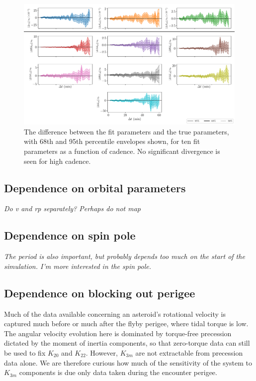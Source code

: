 \documentclass{aastex631}
\newcommand{\jtd}[1]{{\color{red}\textit{#1}}}
\begin{document}
\begin{figure}
  \centering
  \includegraphics[width=\textwidth]{cadence-accuracy.pdf}
  \caption{The difference between the fit parameters and the true parameters, with 68th and 95th percentile envelopes shown, for ten fit parameters as a function of cadence. No significant divergence is seen for high cadence.}
  \label{fig:cadence-accuracy}
\end{figure}

\subsection{Dependence on orbital parameters}

\jtd{Do v and rp separately? Perhaps do not map}

\subsection{Dependence on spin pole}

\jtd{The period is also important, but probably depends too much on the start of the simulation. I'm more interested in the spin pole.}


\subsection{Dependence on blocking out perigee}
\label{sec:block-perigee}
Much of the data available concerning an asteroid's rotational velocity is captured much before or much after the flyby perigee, where tidal torque is low. The angular velocity evolution here is dominated by torque-free precession dictated by the moment of inertia components, so that zero-torque data can still be used to fix $K_{20}$ and $K_{22}$. However, $K_{3m}$ are not extractable from precession data alone. We are therefore curious how much of the sensitivity of the system to $K_{3m}$ components is due only data taken during the encounter perigee.
\end{document}
